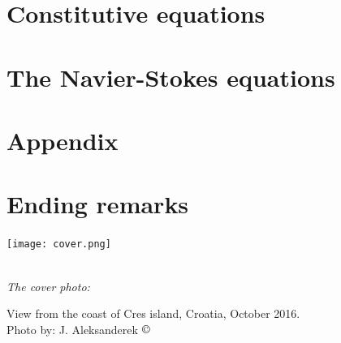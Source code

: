 \documentclass[12pt]{report}
\begin{document}
%


%


%

\chapter{Constitutive equations}



\chapter{The Navier-Stokes equations}







\chapter*{Appendix}

\newpage
\thispagestyle{empty}

\chapter*{Ending remarks}



\begin{flushright}


\texttt{[image: cover.png]}

\setlength{\parskip}{0.1em}
\setlength{\parindent}{0cm}
\ \\[0.5cm]
\textit{The cover photo:}  

View from the coast of Cres island, Croatia, October 2016.
\ \\[0.1cm]
Photo by: J. Aleksanderek $\copyright$
\end{flushright}





\end{document}
